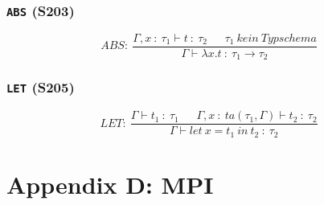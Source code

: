 \subsubsection{\texttt{ABS} (S203)}
\[ABS:~\frac{\Gamma,x~:~\tau_1 \vdash t~:~\tau_2~~~~~~~\tau_1~kein~Typschema}{\Gamma \vdash \lambda x.t~:~\tau_1 \rightarrow \tau_2}\]

\subsubsection{\texttt{LET} (S205)}
\[LET:~\frac{\Gamma \vdash t_1~:~\tau_1~~~~~~~\Gamma,x~:~ta(\tau_1,\Gamma)\vdash t_2~:~\tau_2}{\Gamma \vdash let~x=t_1~in~t_2~:~\tau_2}\]



\section{Appendix D: MPI}
